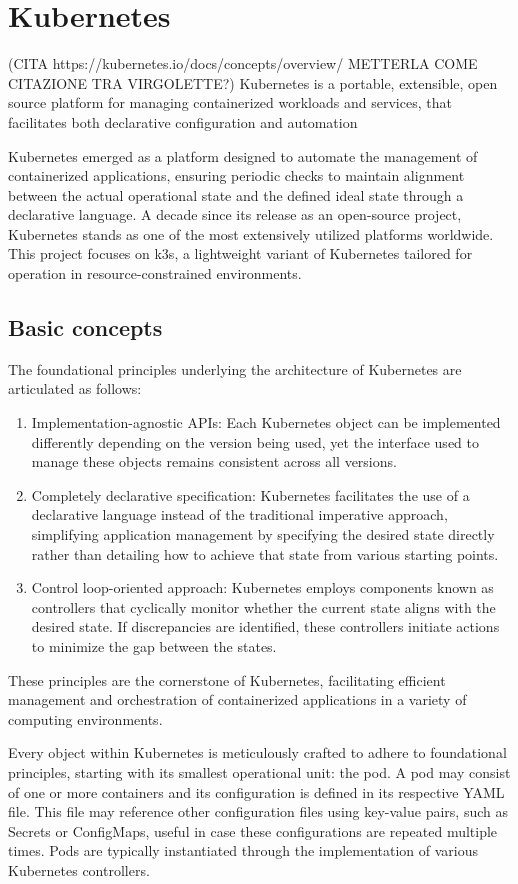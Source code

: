 \chapter{Kubernetes}
(CITA https://kubernetes.io/docs/concepts/overview/  METTERLA COME CITAZIONE TRA VIRGOLETTE?)
Kubernetes is a portable, extensible, open source platform for managing containerized workloads and services, that facilitates both declarative configuration and automation


Kubernetes emerged as a platform designed to automate the management of containerized applications, ensuring periodic checks to maintain alignment between the actual operational state and the defined ideal state through a declarative language. A decade since its release as an open-source project, Kubernetes stands as one of the most extensively utilized platforms worldwide. This project focuses on k3s, a lightweight variant of Kubernetes tailored for operation in resource-constrained environments.

\section{Basic concepts}
The foundational principles underlying the architecture of Kubernetes are articulated as follows:
\begin{enumerate}
\item Implementation-agnostic APIs: Each Kubernetes object can be implemented differently depending on the version being used, yet the interface used to manage these objects remains consistent across all versions.
\item Completely declarative specification: Kubernetes facilitates the use of a declarative language instead of the traditional imperative approach, simplifying application management by specifying the desired state directly rather than detailing how to achieve that state from various starting points.
\item Control loop-oriented approach: Kubernetes employs components known as controllers that cyclically monitor whether the current state aligns with the desired state. If discrepancies are identified, these controllers initiate actions to minimize the gap between the states.
\end{enumerate}
These principles are the cornerstone of Kubernetes, facilitating efficient management and orchestration of containerized applications in a variety of computing environments.

Every object within Kubernetes is meticulously crafted to adhere to foundational principles, starting with its smallest operational unit: the pod. A pod may consist of one or more containers and its configuration is defined in its respective YAML file. This file may reference other configuration files using key-value pairs, such as Secrets or ConfigMaps, useful in case these configurations are repeated multiple times. 
Pods are typically instantiated through the implementation of various Kubernetes controllers.

